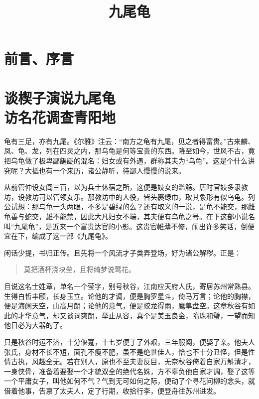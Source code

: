 \documentclass[12pt,UTF8]{ctexbook}
\title{\heiti\zihao{0} 九尾龟}
\author{}
\date{}
\begin{document}
\maketitle
\tableofcontents

\frontmatter
\chapter{前言、序言}

\mainmatter

\chapter[谈楔子演说九尾龟\ 访名花调查青阳地]{谈楔子演说九尾龟\\访名花调查青阳地}

龟有三足，亦有九尾。《尔雅》注云：“南方之龟有九尾，见之者得富贵。”古来麟、凤、龟、龙，列在四灵之内，那乌龟是何等宝贵的东西。降至如今，世风不古，竟把乌龟做了极卑鄙龌龊的混名：妇女或有外遇，群称其夫为“乌龟”。这是个什么讲究呢？大抵也有一个来历，诸公静听，待鄙人慢慢的说来。

从前管仲设女闾三百，以为兵士休宿之所，这便是妓女的滥觞。唐时官妓多隶教坊，设教坊司以管领女乐。那教坊中的人役，皆头裹绿巾，取其象形有似乌龟。列公试想：那乌龟一头两眼，不多是碧绿的么？还有取义的一说，是龟不能交，那雌龟善与蛇交，雄不能禁，因此大凡妇女不端，其夫便有乌龟之号。在下这部小说名叫“九尾龟”，是近来一个富贵达官的小影。这贵官帷薄不修，闹出许多笑话，倒便宜在下，编成了这一部《九尾龟》。

闲话少提，书归正传。且先将一个风流才子类弄登场，好为诸公解秽。正是：

\begin{quotation}
莫把酒杯浇块垒，且将绮梦说莺花。
\end{quotation}

且说这名士姓章，单名一个莹字，别号秋谷，江南应天府人氏，寄居苏州常熟县。生得白皙丰颐，长身玉立。论他的才调，便是胸罗星斗，倚马万言；论他的胸襟，便是海阔天空，山高月朗；论他的意气，便是蛟龙得雨，鹰隼盘空。这章秋谷有如此的才华意气，却又谈词爽朗，举止从容，真个是美玉良金，隋珠和璧，一望而知他日必为大器的了。

只是秋谷时运不济，十分偃蹇，十七岁便丁了外艰，三年服阕，便娶了亲。他夫人张氏，身材不长不短，面孔不瘦不肥，虽不是绝世佳人，恰也不十分丑怪，但是性情古执，风趣全无。若在别人，原也不至夫妻反目，无奈秋谷倚着自家万斛清才，一身侠骨，准备着要娶一个才貌双全的绝代名姝，方不辜负他自家才调，娶了这等一个平庸女子，叫他如何不气？气到无可如何之际，便动了个寻花问柳的念头，就借着他事，告禀了太夫人，定了行期，收拾行李，便登舟往苏州进发。
\end{document}
